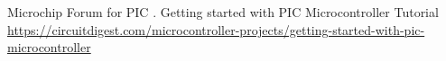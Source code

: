 \documentclass[conference]{IEEEtran}
\begin{document}
%
%
%
\begin{thebibliography}{1}

Microchip Forum for PIC .
Getting started with PIC Microcontroller Tutorial\\
\url{https://circuitdigest.com/microcontroller-projects/getting-started-with-pic-microcontroller}\end{thebibliography}




\end{document}

